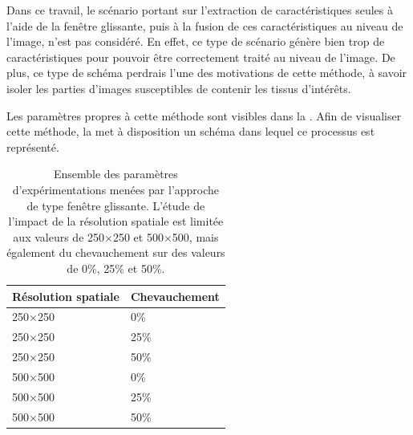 Dans ce travail, le scénario portant sur l'extraction de caractéristiques seules à l'aide de la fenêtre glissante, puis à la fusion de ces caractéristiques au niveau de l'image, n'est pas considéré. En effet, ce type de scénario génère bien trop de caractéristiques pour pouvoir être correctement traité au niveau de l'image. De plus, ce type de schéma perdrais l'une des motivations de cette méthode, à savoir isoler les parties d'images susceptibles de contenir les tissus d'intérêts.\par
 
Les paramètres propres à cette méthode sont visibles dans la . Afin de visualiser cette méthode, la  met à disposition un schéma dans lequel ce processus est représenté.\par

\begin{table}[H]
    \centering
    \begin{tabular*}{0,6\linewidth}{l@{\extracolsep{\fill}}l}
        \toprule
        \textbf{Résolution spatiale}& \textbf{Chevauchement}   \\ \hline
        250$\times$250              & 0\%                      \\ \hline
        250$\times$250              & 25\%                     \\ \hline
        250$\times$250              & 50\%                     \\ \hline 
        500$\times$500              & 0\%                      \\ \hline
        500$\times$500              & 25\%                     \\ \hline
        500$\times$500              & 50\%                     \\
        \bottomrule
    \end{tabular*}
    \caption{Ensemble des paramètres d'expérimentations menées par l'approche de type fenêtre glissante. L'étude de l'impact de la résolution spatiale est limitée aux valeurs de 250$\times$250 et 500$\times$500, mais également du chevauchement sur des valeurs de 0\%, 25\% et 50\%.}
    \label{tab:parameters_image_improvement_sliding_window_parameters}
\end{table}\par

